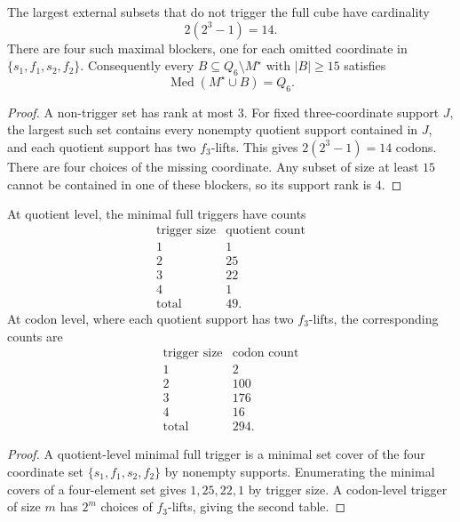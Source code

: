 \begin{theorem}
\label{thm:philosophy-maximum-nontrigger-blockers}
The largest external subsets that do not trigger the full cube have
cardinality
$$
  2(2^{3}-1)=14.
$$
There are four such maximal blockers, one for each omitted coordinate
in $\{s_{1},f_{1},s_{2},f_{2}\}$. Consequently every
$B\subseteq Q_{6}\setminus M^{\star}$ with $|B|\geq 15$ satisfies
$$
  \operatorname{Med}(M^{\star}\cup B)=Q_{6}.
$$
\end{theorem}
\begin{proof}
A non-trigger set has rank at most $3$. For fixed three-coordinate
support $J$, the largest such set contains every nonempty quotient
support contained in $J$, and each quotient support has two
$f_{3}$-lifts. This gives $2(2^{3}-1)=14$ codons. There are four choices
of the missing coordinate. Any subset of size at least $15$ cannot be
contained in one of these blockers, so its support rank is $4$.
\end{proof}

\begin{theorem}
\label{thm:philosophy-minimal-full-triggers}
At quotient level, the minimal full triggers have counts
$$
\begin{array}{c|r}
  \text{trigger size} & \text{quotient count}\\
  \hline
  1 & 1\\
  2 & 25\\
  3 & 22\\
  4 & 1\\
  \hline
  \text{total} & 49.
\end{array}
$$
At codon level, where each quotient support has two $f_{3}$-lifts, the
corresponding counts are
$$
\begin{array}{c|r}
  \text{trigger size} & \text{codon count}\\
  \hline
  1 & 2\\
  2 & 100\\
  3 & 176\\
  4 & 16\\
  \hline
  \text{total} & 294.
\end{array}
$$
\end{theorem}
\begin{proof}
A quotient-level minimal full trigger is a minimal set cover of the four
coordinate set $\{s_{1},f_{1},s_{2},f_{2}\}$ by nonempty supports.
Enumerating the minimal covers of a four-element set gives
$1,25,22,1$ by trigger size. A codon-level trigger of size $m$ has
$2^{m}$ choices of $f_{3}$-lifts, giving the second table.
\end{proof}

